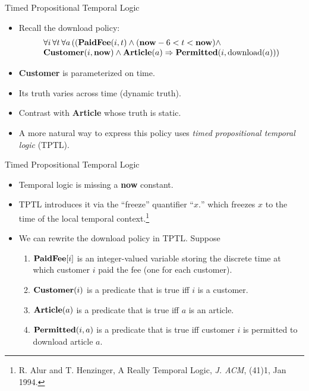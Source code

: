 \documentclass[style=sailor,size=12pt]{powerdot}
\newcommand{\rid}[1]{\mbox{\rm #1}}
\newcommand{\bid}[1]{\mbox{\bf #1}}
\begin{document}
\begin{wideslide}[bm=,toc=]{Timed Propositional Temporal Logic}
\begin{itemize}
\item Recall the download policy:
\begin{displaymath}
\begin{array}{l}
\forall i\, \forall t\, \forall a\, ((\bid{PaidFee}(i,t)\wedge (\bid{now} - 6 < t < \bid{now})\wedge \\
\bid{Customer}(i,\bid{now})\wedge\bid{Article}(a) \Rightarrow \bid{Permitted}(i,\rid{download}(a)))
\end{array}
\end{displaymath}
\item {\bf Customer} is parameterized on time.
\item Its truth varies across time (dynamic truth).
\item Contrast with {\bf Article} whose truth is static.
\item A more natural way to express this policy uses {\em timed propositional temporal logic\/} (TPTL).
\end{itemize}
\end{wideslide}

\begin{wideslide}[bm=,toc=]{Timed Propositional Temporal Logic}
\begin{itemize}
\item Temporal logic is missing a {\bf now} constant.
\item TPTL introduces it via the ``freeze'' quantifier ``$x.$'' which freezes $x$ to the
time of the local temporal context.\footnote{
R. Alur and T. Henzinger, A Really Temporal Logic, {\em J. ACM\/},
(41)1, Jan 1994.}
\item We can rewrite the download policy in TPTL.  Suppose
\begin{enumerate}
\item $\bid{PaidFee}[i]$ is an integer-valued variable storing
the discrete time at which customer $i$ paid the fee (one for each customer).
\item $\bid{Customer}(i)$ is a predicate that is true iff $i$ is a customer.
\item $\bid{Article}(a)$ is a predicate that is true iff $a$ is an article.
\item $\bid{Permitted}(i,a)$ is a predicate that is true iff 
customer $i$ is permitted to download article $a$.
\end{enumerate}
\end{itemize}
\end{wideslide}
\end{document}
